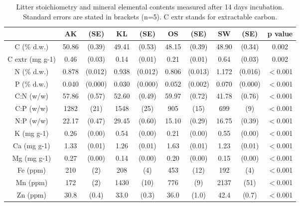 \documentclass[authoryear,preprint,review,12pt]{elsarticle}
\begin{document}
\newpage
\begin{table}[h!]
\begin{center}
\caption{Litter stoichiometry and mineral elemental contents measured after 14 days incubation. Standard errors are stated in brackets (n=5). C extr stands for extractable carbon.}
\label{initstoech}
{\tiny
\begin{tabular}{cccccccccc}
  \hline
 & AK & (SE) & KL & (SE) & OS & (SE) & SW & (SE) & p value \\ 
  \hline
C (\% d.w.) & 50.86 & (0.39) & 49.41 & (0.53) & 48.15 & (0.39) & 48.90 & (0.34) & 0.002 \\ 
  C extr (mg g-1) & 0.46 & (0.03) & 0.14 & (0.01) & 0.21 & (0.01) & 0.64 & (0.03) & 0.002 \\ 
  N (\% d.w.) & 0.878 &  (0.012) & 0.938 &  (0.012) & 0.806 &  (0.013) & 1.172 &  (0.016) & $<$0.001 \\ 
  P (\% d.w.) & 0.040 & (0.000) & 0.030 & (0.000) & 0.052 & (0.002) & 0.070 & (0.000) & $<$0.001 \\ 
  C:N (w/w) & 57.86 &  (0.57) & 52.60 &  (0.49) & 59.97 &  (0.72) & 41.78 &  (0.76) & $<$0.001 \\ 
  C:P (w/w) & 1282 & (21) & 1548 & (25) & 905 & (15) & 699 & (9) & $<$0.001 \\ 
  N:P (w/w) & 22.17 & (0.47) & 29.45 & (0.60) & 15.10 & (0.29) & 16.75 & (0.39) & $<$0.001 \\ 
  K (mg g-1) & 0.26 & (0.00) & 0.54 & (0.00) & 0.21 & (0.00) & 0.55 & (0.00) & $<$0.001 \\ 
  Ca (mg g-1) & 1.33 & (0.01) & 1.26 & (0.01) & 1.63 & (0.01) & 1.23 & (0.01) & $<$0.001 \\ 
  Mg (mg g-1) & 0.27 &  (0.00) & 0.14 &  (0.00) & 0.20 &  (0.00) & 0.15 &  (0.00) & $<$0.001 \\ 
  Fe (ppm) & 210 & (2) & 208 & (4) & 453 & (12) & 192 & (4) & $<$0.001 \\ 
  Mn (ppm) & 172 &  (2) & 1430 &  (10) & 776 &  (9) & 2137 &  (51) & $<$0.001 \\ 
  Zn (ppm) & 30.8 & (0.4) & 33.0 & (0.3) & 36.0 & (1.0) & 42.4 & (0.7) & $<$0.001 \\ 
   \hline
\end{tabular}
}
\end{center}
\end{table}
\newpage
\end{document}
